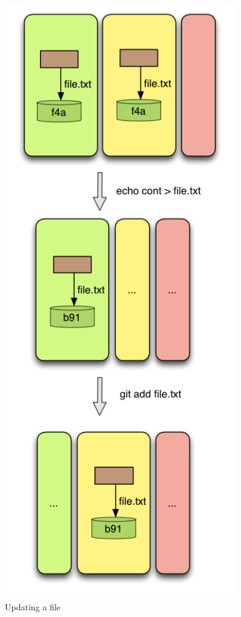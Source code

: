 \begin{figure}[tp]
\begin{minipage}[b]{0.5\linewidth}
      \includegraphics[width=0.9\textwidth]{images/update1.png}
      \caption{Updating a file}\label{fig:update1}
   \end{minipage}
\end{figure}

